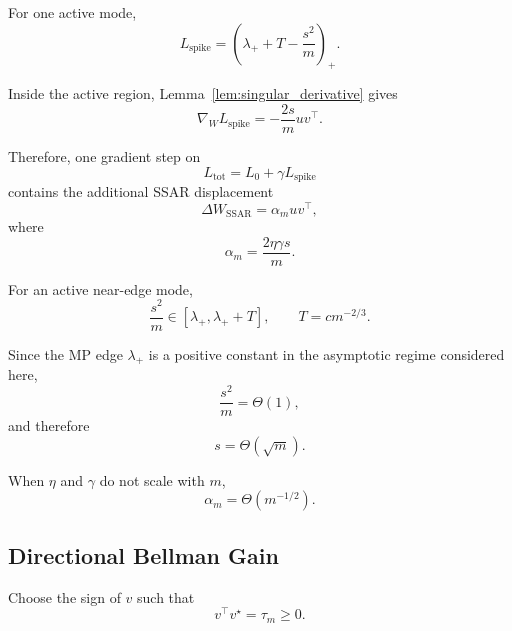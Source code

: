 For one active mode,
\begin{equation}
L_{\mathrm{spike}}
=
\left(
\lambda_+ + T-\frac{s^2}{m}
\right)_+.
\end{equation}

Inside the active region, Lemma~\ref{lem:singular_derivative} gives
\begin{equation}
\nabla_WL_{\mathrm{spike}}
=
-\frac{2s}{m}uv^\top.
\label{eq:spike_gradient_app}
\end{equation}

Therefore, one gradient step on
\begin{equation}
L_{\mathrm{tot}}
=
L_0+\gamma L_{\mathrm{spike}}
\end{equation}
contains the additional SSAR displacement
\begin{equation}
\Delta W_{\mathrm{SSAR}}
=
\alpha_muv^\top,
\label{eq:ssar_displacement_app}
\end{equation}
where
\begin{equation}
\alpha_m
=
\frac{2\eta\gamma s}{m}.
\label{eq:alpha_app}
\end{equation}

For an active near-edge mode,
\begin{equation}
\frac{s^2}{m}
\in
[\lambda_+,\lambda_++T],
\qquad
T=cm^{-2/3}.
\end{equation}

Since the MP edge $\lambda_+$ is a positive constant in the asymptotic
regime considered here,
\begin{equation}
\frac{s^2}{m}
=
\Theta(1),
\end{equation}
and therefore
\begin{equation}
s=\Theta(\sqrt m).
\end{equation}

When $\eta$ and $\gamma$ do not scale with $m$,
\begin{equation}
\alpha_m
=
\Theta(m^{-1/2}).
\label{eq:alpha_order_app}
\end{equation}


\subsection{Directional Bellman Gain}

Choose the sign of $v$ such that
\begin{equation}
v^\top v^\star
=
\tau_m
\geq0.
\end{equation}

